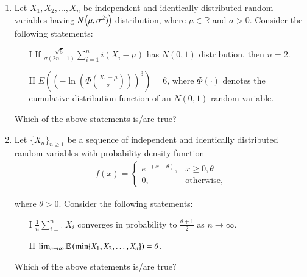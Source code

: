\documentclass[journal,12pt,onecolumn]{IEEEtran}
\theoremstyle{remark}
\begin{document}
\begin{enumerate}
\item Let $X_1, X_2, \dots, X_n$ be independent and identically distributed random variables having $N\left(\mu, \sigma^2)\right)$ distribution, where $\mu \in \mathbb{R}$ and $\sigma > 0$. Consider the following statements:

\begin{enumerate}
    \item[I] If $\frac{\sqrt{5}}{\sigma(2n + 1)} \sum_{i = 1}^{n} i (X_{i} - \mu )$ has $N(0, 1)$ distribution, then $n = 2$.
    \item[II] $E\left(\left(-\ln\left(\Phi \left(\frac{X_{1} - \mu }{\sigma}\right)\right)\right)^{3}\right) = 6$, where $\Phi(\cdot)$ denotes the cumulative distribution function of an $N(0, 1)$ random variable.
\end{enumerate}

Which of the above statements is/are true?

\begin{enumerate}
\end{enumerate}


\item Let $\{X_n\}_{n \geq 1}$ be a sequence of independent and identically distributed random variables with probability density function
\begin{align}
f(x) = \begin{cases}
e^{-(x - \theta)}, & x \geq 0,\theta \ \\
0, & \text{otherwise},
\end{cases}
\end{align}

where $\theta > 0$. Consider the following statements:
\begin{enumerate}
\item[I] $\frac{1}{n} \sum_{i=1}^n X_i$ converges in probability to $\frac{\theta + 1}{2}$ as $n \to \infty$.

\item[II] $\lim_{n \to \infty} \mathbb{E}\left(\min\{X_1, X_2, \dots, X_n\}\right) = \theta $.
\end{enumerate}
Which of the above statements is/are true?


\end{enumerate}
\end{document}
